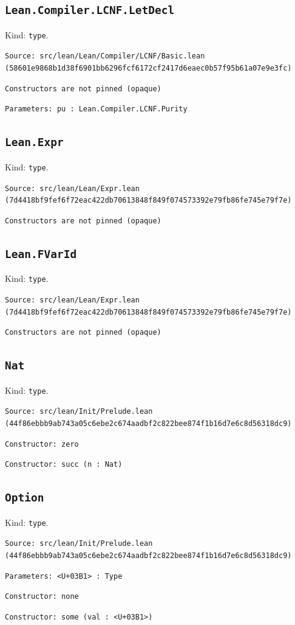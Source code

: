 \documentclass[11pt]{article}
\begin{document}
\subsection*{\texttt{Lean.Compiler.LCNF.LetDecl}}
\noindent Kind: \texttt{type}.\par
\noindent \texttt{Source: src/lean/Lean/Compiler/LCNF/Basic.lean (58601e9868b1d38f6901bb6296fcf6172cf2417d6eaec0b57f95b61a07e9e3fc)}\par
\noindent \texttt{Constructors are not pinned (opaque)}\par
\noindent \texttt{Parameters: pu : Lean.Compiler.LCNF.Purity}\par
\subsection*{\texttt{Lean.Expr}}
\noindent Kind: \texttt{type}.\par
\noindent \texttt{Source: src/lean/Lean/Expr.lean (7d4418bf9fef6f72eac422db70613848f849f074573392e79fb86fe745e79f7e)}\par
\noindent \texttt{Constructors are not pinned (opaque)}\par
\subsection*{\texttt{Lean.FVarId}}
\noindent Kind: \texttt{type}.\par
\noindent \texttt{Source: src/lean/Lean/Expr.lean (7d4418bf9fef6f72eac422db70613848f849f074573392e79fb86fe745e79f7e)}\par
\noindent \texttt{Constructors are not pinned (opaque)}\par
\subsection*{\texttt{Nat}}
\noindent Kind: \texttt{type}.\par
\noindent \texttt{Source: src/lean/Init/Prelude.lean (44f86ebbb9ab743a05c6ebe2c674aadbf2c822bee874f1b16d7e6c8d56318dc9)}\par
\noindent \texttt{Constructor: zero }\par
\noindent \texttt{Constructor: succ (n : Nat)}\par
\subsection*{\texttt{Option}}
\noindent Kind: \texttt{type}.\par
\noindent \texttt{Source: src/lean/Init/Prelude.lean (44f86ebbb9ab743a05c6ebe2c674aadbf2c822bee874f1b16d7e6c8d56318dc9)}\par
\noindent \texttt{Parameters: <U+03B1> : Type}\par
\noindent \texttt{Constructor: none }\par
\noindent \texttt{Constructor: some (val : <U+03B1>)}\par
\end{document}
